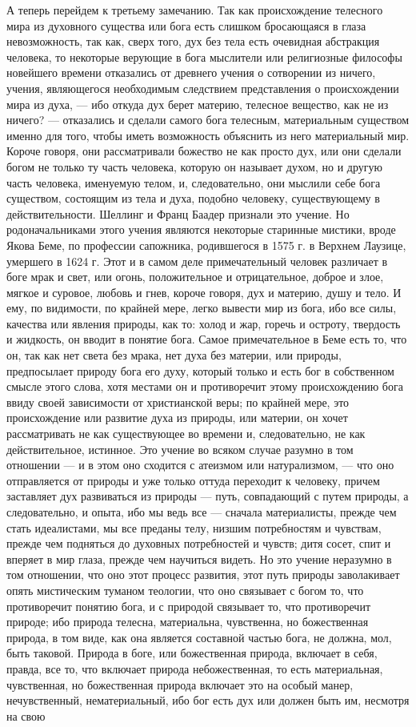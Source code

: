 \documentclass[12pt]{article}
\begin{document}
А теперь перейдем к третьему замечанию. Так как происхождение телесного мира из духовного существа или бога есть слишком бросающаяся в глаза невозможность, так как, сверх того, дух без тела есть очевидная абстракция человека, то некоторые верующие в бога мыслители или религиозные философы новейшего времени отказались от древнего учения о сотворении из ничего, учения, являющегося необходимым следствием представления о происхождении мира из духа, --- ибо откуда дух берет материю, телесное вещество, как не из ничего? --- отказались и сделали самого бога телесным, материальным существом именно для того, чтобы иметь возможность объяснить из него материальный мир. Короче говоря, они рассматривали божество не как просто дух, или они сделали богом не только ту часть человека, которую он называет духом, но и другую часть человека, именуемую телом, и, следовательно, они мыслили себе бога существом, состоящим из тела и духа, подобно человеку, существующему в действительности. Шеллинг и Франц Баадер признали это учение. Но родоначальниками этого учения являются некоторые старинные мистики, вроде Якова Беме, по профессии сапожника, родившегося в 1575 г. в Верхнем Лаузице, умершего в 1624 г. Этот и в самом деле примечательный человек различает в боге мрак и свет, или огонь, положительное и отрицательное, доброе и злое, мягкое и суровое, любовь и гнев, короче говоря, дух и материю, душу и тело. И ему, по видимости, по крайней мере, легко вывести мир из бога, ибо все силы, качества или явления природы, как то: холод и жар, горечь и остроту, твердость и жидкость, он вводит в понятие бога. Самое примечательное в Беме есть то, что он, так как нет света без мрака, нет духа без материи, или природы, предпосылает природу бога его духу, который только и есть бог в собственном смысле этого слова, хотя местами он и противоречит этому происхождению бога ввиду своей зависимости от христианской веры; по крайней мере, это происхождение или развитие духа из природы, или материи, он хочет рассматривать не как существующее во времени и, следовательно, не как действительное, истинное. Это учение во всяком случае разумно в том отношении --- и в этом оно сходится с атеизмом или натурализмом, --- что оно отправляется от природы и уже только оттуда переходит к человеку, причем заставляет дух развиваться из природы --- путь, совпадающий с путем природы, а следовательно, и опыта, ибо мы ведь все --- сначала материалисты, прежде чем стать идеалистами, мы все преданы телу, низшим потребностям и чувствам, прежде чем подняться до духовных потребностей и чувств; дитя сосет, спит и вперяет в мир глаза, прежде чем научиться видеть. Но это учение неразумно в том отношении, что оно этот процесс развития, этот путь природы заволакивает опять мистическим туманом теологии, что оно связывает с богом то, что противоречит понятию бога, и с природой связывает то, что противоречит природе; ибо природа телесна, материальна, чувственна, но божественная природа, в том виде, как она является составной частью бога, не должна, мол, быть таковой. Природа в боге, или божественная природа, включает в себя, правда, все то, что включает природа небожественная, то есть материальная, чувственная, но божественная природа включает это на особый манер, нечувственный, нематериальный, ибо бог есть дух или должен быть им, несмотря на свою 
\end{document}
